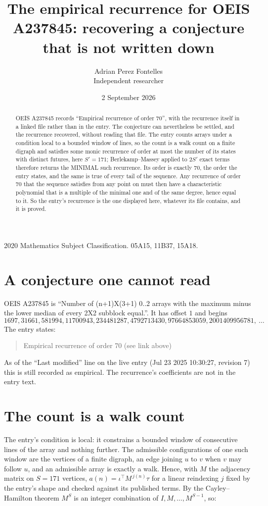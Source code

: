 \documentclass[11pt,a4paper]{article}
\title{The empirical recurrence for OEIS A237845: recovering a conjecture that is not written down}
\author{Adrian Perez Fontelles\\ \small Independent researcher}
\date{2 September 2026}
\theoremstyle{plain}
\theoremstyle{definition}
\begin{document}
\maketitle

\begin{abstract}
OEIS A237845 records ``Empirical recurrence of order $70$'', with the recurrence itself in a
linked file rather than in the entry. The conjecture can nevertheless be settled, and the
recurrence recovered, without reading that file. The entry counts arrays under a condition
local to a bounded window of lines, so the count is a walk count on a finite digraph and
satisfies some monic recurrence of order at most the number of its states with distinct
futures, here $S'=171$; Berlekamp--Massey applied to $2S'$ exact
terms therefore returns the MINIMAL such recurrence. Its order is exactly $70$, the order
the entry states, and the same is true of every tail of the sequence. Any recurrence of order
$70$ that the sequence satisfies from any point on must then have a characteristic
polynomial that is a multiple of the minimal one and of the same degree, hence equal to it. So
the entry's recurrence is the one displayed here, whatever its file contains, and it is
proved.
\end{abstract}

\noindent\small 2020 Mathematics Subject Classification. 05A15, 11B37, 15A18.\normalsize

\section{A conjecture one cannot read}

OEIS A237845 is ``Number of (n+1)X(3+1) 0..2 arrays with the maximum minus the lower median of every 2X2 subblock equal.''. It has offset $1$ and begins
\[
1697, 31661, 581994, 11700943, 234481287, 4792713430, 97664853059, 2001409956781,\ \dots
\]
The entry states:
\begin{quote}
Empirical recurrence of order 70 (see link above)
\end{quote}
As of the ``Last modified'' line on the live entry (Jul 23 2025 10:30:27, revision 7) this is still
recorded as empirical. The recurrence's coefficients are not in the entry text.

\section{The count is a walk count}

The entry's condition is local: it constrains a bounded window of consecutive lines of the
array and nothing further. The admissible configurations of one such window are the vertices
of a finite digraph, an edge joining $u$ to $v$ when $v$ may follow $u$, and an admissible
array is exactly a walk. Hence, with $M$ the adjacency matrix on $S=171$ vertices,
$a(n)=\iota^{\!\top}M^{\,j(n)}\tau$ for a linear reindexing $j$ fixed by the entry's shape
and checked against its published terms. By the Cayley--Hamilton theorem $M^{S}$ is an
integer combination of $I,M,\dots,M^{S-1}$, so:
\end{document}

